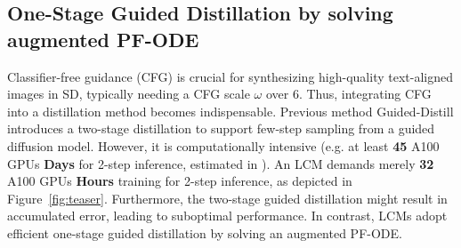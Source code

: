 \documentclass{article} %
\newcommand{\jian}[1]{\textcolor{red}{#1}}
\begin{document}
\vspace{-10pt}
\subsection{One-Stage Guided Distillation by solving augmented PF-ODE \label{sec:aug_pf_ode}}
\vspace{-5pt}
Classifier-free guidance (CFG) \citep{ho2022classifier} is crucial for synthesizing high-quality text-aligned images in SD, typically needing a CFG scale $\omega$ over $6$. Thus, integrating CFG into a distillation method becomes indispensable. Previous method Guided-Distill \citep{meng2023distillation} introduces a two-stage distillation to support few-step sampling from a guided diffusion model. However, it is computationally intensive (e.g. at least \textbf{45} A100 GPUs \textbf{Days} for 2-step inference, estimated in \citep{liu2023instaflow}). An LCM demands merely \textbf{32} A100 GPUs \textbf{Hours} training for 2-step inference, as depicted in Figure~\ref{fig:teaser}. Furthermore, the two-stage guided distillation might result in accumulated error, leading to suboptimal performance. In contrast, LCMs adopt efficient one-stage guided distillation by solving an augmented PF-ODE. 
\end{document}
